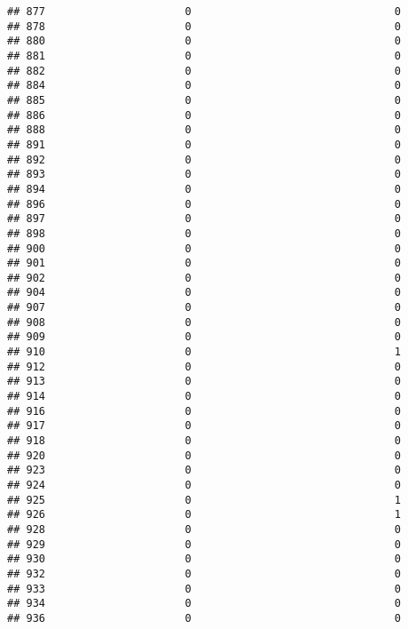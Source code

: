 \documentclass[
]{article}
\begin{document}
\begin{verbatim}
## 877                      0                                0
## 878                      0                                0
## 880                      0                                0
## 881                      0                                0
## 882                      0                                0
## 884                      0                                0
## 885                      0                                0
## 886                      0                                0
## 888                      0                                0
## 891                      0                                0
## 892                      0                                0
## 893                      0                                0
## 894                      0                                0
## 896                      0                                0
## 897                      0                                0
## 898                      0                                0
## 900                      0                                0
## 901                      0                                0
## 902                      0                                0
## 904                      0                                0
## 907                      0                                0
## 908                      0                                0
## 909                      0                                0
## 910                      0                                1
## 912                      0                                0
## 913                      0                                0
## 914                      0                                0
## 916                      0                                0
## 917                      0                                0
## 918                      0                                0
## 920                      0                                0
## 923                      0                                0
## 924                      0                                0
## 925                      0                                1
## 926                      0                                1
## 928                      0                                0
## 929                      0                                0
## 930                      0                                0
## 932                      0                                0
## 933                      0                                0
## 934                      0                                0
## 936                      0                                0

\end{verbatim}
\end{document}
